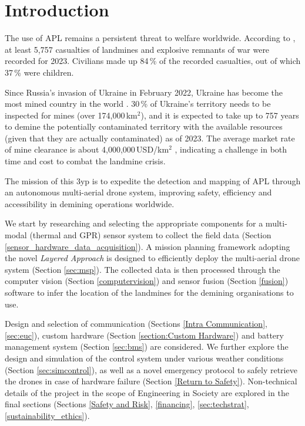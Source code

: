 \section{Introduction} \label{introduction}

The use of \gls{APL} remains a persistent threat to welfare worldwide. According to \cite{icbl2024landmine}, at least 5,757 casualties of landmines and explosive remnants of war were recorded for 2023. Civilians made up 84\,\% of the recorded casualties, out of which 37\,\% were children. 

Since Russia's invasion of Ukraine in February 2022, Ukraine has become the most mined country in the world \cite{globsec2024ukraine}. 30\,\% of Ukraine's territory needs to be inspected for mines (over 174,000\,km$^2$), and it is expected to take up to 757 years to demine the potentially contaminated territory with the available resources (given that they are actually contaminated) as of 2023. The average market rate of mine clearance is about 4,000,000\,USD/km$^2$ \cite{globsec2023ukraine}, indicating a challenge in both time and cost to combat the landmine crisis. 

The mission of this \gls{3yp} is to expedite the detection and mapping of \gls{APL} through an autonomous multi-aerial drone system, improving safety, efficiency and accessibility in demining operations worldwide. 










We start by researching and selecting the appropriate components for a multi-modal (thermal and \gls{GPR}) sensor system to collect the field data (Section \ref{sensor_hardware_data_acquisition}). A mission planning framework adopting the novel \textit{Layered Approach} is designed to efficiently deploy the multi-aerial drone system (Section \ref{sec:msp}). The collected data is then processed through the computer vision (Section \ref{computervision}) and sensor fusion (Section \ref{fusion}) software to infer the location of the landmines for the demining organisations to use. 

Design and selection of communication (Sections \ref{Intra Communication}, \ref{sec:euc}), custom hardware (Section \ref{section:Custom Hardware}) and battery management system (Section \ref{sec:bms}) are considered. We further explore the design and simulation of the control system under various weather conditions (Section \ref{sec:simcontrol}), as well as a novel emergency protocol to safely retrieve the drones in case of hardware failure (Section \ref{Return to Safety}). Non-technical details of the project in the scope of Engineering in Society are explored in the final sections (Sections \ref{Safety and Risk}, \ref{financing}, \ref{sec:techstrat}, \ref{sustainability_ethics}). 

